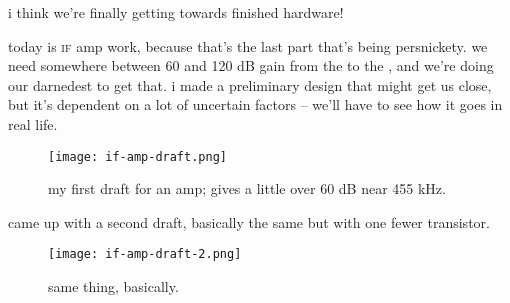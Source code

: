 i think we're finally getting towards finished hardware!

today is \textsc{if} amp work, because that's the last part that's being
persnickety. we need somewhere between 60 and 120 dB gain from the \lna to the
\adc, and we're doing our darnedest to get that. i made a preliminary design
that might get us close, but it's dependent on a lot of uncertain factors --
we'll have to see how it goes in real life.

\begin{figure}[H]
	\centering
	\texttt{[image: if-amp-draft.png]}
	\caption{my first draft for an amp; gives a little over 60 dB near 455
	kHz.}
\end{figure}

came up with a second draft, basically the same but with one fewer transistor.

\begin{figure}[H]
	\centering
	\texttt{[image: if-amp-draft-2.png]}
	\caption{same thing, basically.}
\end{figure}
